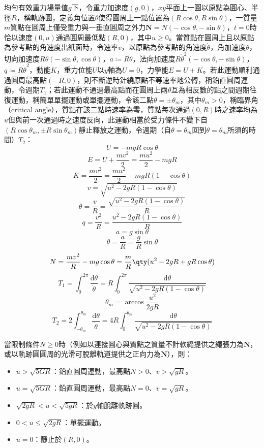 \documentclass[a4paper,12pt]{article}
\begin{document}
均勻有效重力場量值$g$下，令重力加速度$(g,0)$，$xy$平面上一圓以原點為圓心、半徑$R$，稱軌跡圓，定義角位置$\theta$使得圓周上一點位置為$(R\cos\theta,R\sin\theta)$，一質量$m$質點在圓周上僅受重力與一垂直圓周之外力$\mathbf{N}=N(-\cos\theta,-\sin\theta)$，$t=0$時恰以速度$(0,u)$通過圓周最低點$(R,0)$，其中$u\geq 0$。當質點在圓周上且以原點為參考點的角速度出紙面時，令速率$v$，以原點為參考點的角速度$\dot{\theta}$，角加速度$\ddot{\theta}$，切向加速度$R\ddot{\theta}(-\sin\theta,\cos\theta)$，$a\coloneq R\ddot{\theta}$，法向加速度$R\dot{\theta}^2(-\cos\theta,-\sin\theta)$，$q\coloneq R\dot{\theta}^2$，動能$K$，重力位能$U$以$y$軸為$U=0$，力學能$E=U+K$。若此運動順利通過圓周最高點$(-R,0)$，則不斷逆時針繞原點不等速率地公轉，稱鉛直圓周運動，令週期$T_1$；若此運動不通過最高點而在圓周上兩$\theta$互為相反數的點之間週期往復運動，稱簡單單擺運動或單擺運動，令該二點$\theta=\pm\theta_m$，其中$\theta_m>0$，稱臨界角（critical angle），質點在該二點時速率為零，質點每次通過$(0,R)$時之速率均為$u$但與前一次通過時之速度反向，此運動相當於受力條件不變下自$(R\cos\theta_m,\pm R\sin\theta_m)$靜止釋放之運動，令週期（自$\theta=\theta_m$回到$\theta=\theta_m$所須的時間）$T_2$：
\[U=-mgR\cos\theta\]
\[E=U+\frac{mv^2}{2}=\frac{mu^2}{2}-mgR\]
\[K=\frac{mv^2}{2}=\frac{mu^2}{2}-mgR(1-\cos\theta)\]
\[v=\sqrt{u^2-2gR(1-\cos\theta)}\]
\[\dot{\theta}=\frac{v}{R}=\frac{\sqrt{u^2-2gR(1-\cos\theta)}}{R}\]
\[q=\frac{v^2}{R}=\frac{u^2-2gR(1-\cos\theta)}{R}\]
\[a=g\sin\theta\]
\[\ddot{\theta}=\frac{a}{R}=\frac{g}{R}\sin\theta\]
\[N=\frac{mv^2}{R}-mg\cos\theta=\frac{m}{R}\qty(u^2-2gR+gR\cos\theta)\]
\[T_1=\int_0^{2\pi}\frac{\mathrm{d}\theta}{\dot{\theta}}=R\int_0^{2\pi}\frac{\mathrm{d}\theta}{\sqrt{u^2-2gR(1-\cos\theta)}}\]
\[\theta_m=\arccos\frac{u^2}{2gR}\]
\[T_2=2\int_{-\theta_m}^{\theta_m}\frac{\mathrm{d}\theta}{\dot{\theta}}=4R\int_0^{\theta_m}\frac{\mathrm{d}\theta}{\sqrt{u^2-2gR(1-\cos\theta)}}\]

當限制條件$N\geq 0$時（例如以連接圓心與質點之質量不計軟繩提供之繩張力為$\mathbf{N}$，或以軌跡圓圓周的光滑可脫離軌道提供之正向力為$\mathbf{N}$），則：
\begin{itemize}
\item $u>\sqrt{5GR}$：鉛直圓周運動，最高點$N>0$、$v>\sqrt{gR}$。
\item $u=\sqrt{5GR}$：鉛直圓周運動，最高點$N=0$、$v=\sqrt{gR}$。
\item $\sqrt{2gR}<u<\sqrt{5gR}$：於$y$軸脫離軌跡圓。
\item $0<u\leq\sqrt{2gR}$：單擺運動。
\item $u=0$：靜止於$(R,0)$。
\end{itemize}
\end{document}
